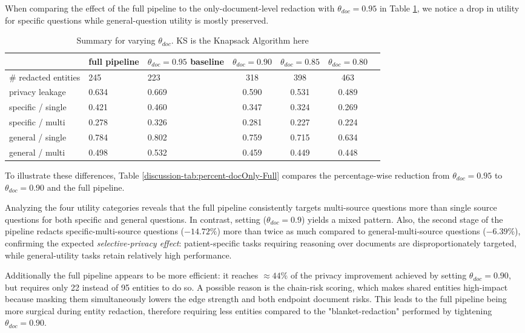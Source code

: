 When comparing the effect of the full pipeline to the only-document-level redaction with $\theta_{doc} = 0.95$ in Table \ref{discussion-tab:theta_doc_llm}, we notice a drop in utility for specific questions while general-question utility is mostly preserved. 

\begin{table}[h!]
\centering
\caption{Summary for varying $\theta_{doc}$. KS is the Knapsack Algorithm here}
\label{discussion-tab:theta_doc_llm}
\begin{tabular}{l p{1.5cm} p{2cm} c c c c}
\toprule
\textbf{ } & \textbf{full pipeline} & $\theta_{doc} = 0.95$ {baseline}& $\theta_{doc} = 0.90$ &  $\theta_{doc} = 0.85$ & $\theta_{doc} = 0.80$\\
\midrule
\# redacted entities & 245 & 223 & 318 & 398 & 463  \\
\midrule
privacy leakage & 0.634 &0.669 &0.590 &0.531 &0.489  \\
\midrule
specific / single & 0.421 & 0.460 & 0.347 & 0.324 & 0.269 \\
specific / multi & 0.278 & 0.326 & 0.281 & 0.227 & 0.224  \\
general / single & 0.784 & 0.802 & 0.759 & 0.715 & 0.634  \\
general / multi & 0.498 & 0.532 & 0.459 & 0.449 & 0.448  \\

\bottomrule
\end{tabular}
\end{table}


To illustrate these differences, Table \ref{discussion-tab:percent-docOnly-Full} compares the percentage-wise reduction from $\theta_{doc} = 0.95$ to $\theta_{doc} = 0.90$ and the full pipeline. 

Analyzing the four utility categories reveals that the full pipeline consistently targets multi-source questions more than single source questions for both specific and general questions. In contrast, setting ($\theta_{doc} = 0.9$) yields a mixed pattern. Also, the second stage of the pipeline redacts specific-multi-source questions ($-14.72\%$) more than twice as much compared to general-multi-source questions ($-6.39\%$), confirming the expected \textit{selective-privacy effect}: patient-specific tasks requiring reasoning over documents are disproportionately targeted, while general-utility tasks retain relatively high performance.


Additionally the full pipeline appears to be more efficient: it reaches $\approx 44\%$ of the privacy improvement achieved by setting $\theta_{doc} = 0.90$, but requires only 22 instead of 95 entities to do so. A possible reason is the chain-risk scoring, which makes shared entities high-impact because masking them simultaneously lowers the edge strength and both endpoint document risks. This leads to the full pipeline being more surgical during entity redaction, therefore requiring less entities compared to the "blanket-redaction" performed by tightening $\theta_{doc} = 0.90$.

